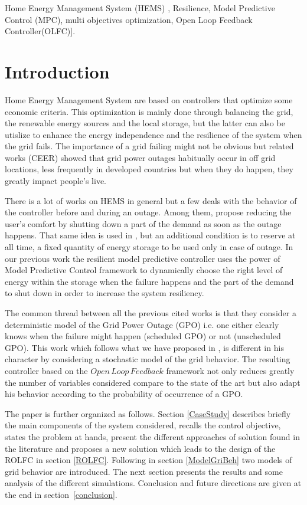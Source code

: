 \documentclass[conference]{IEEEtran}
\begin{document}
\begin{IEEEkeywords}
Home Energy Management System (HEMS) , Resilience, Model Predictive Control (MPC), multi objectives optimization, Open Loop Feedback Controller(OLFC)].
\end{IEEEkeywords}

\section{Introduction}
Home Energy Management System are based on controllers that optimize some economic criteria. This optimization is mainly done through balancing the grid, the renewable energy sources and the local storage, but the latter can also be utislize to enhance the energy independence and the resilience of the system when the grid fails. The importance of a grid failing might not be obvious but related works (CEER) showed that grid power outages habitually occur in off grid locations, less frequently in developed countries but when they do happen, they greatly impact people's live.

There is a lot of works on HEMS in general but a few deals with the behavior of the controller before and during an outage. Among them, \cite{HGhRBo2015,RRoFBe2014} propose reducing the user's comfort by shutting down a part of the demand as soon as the outage happens. That same idea is used in \cite{JMaHJa2016}, but an additional condition is to reserve at all time, a fixed quantity of energy storage to be used only in case of outage. In our previous work \cite{JPrPHa2019} the resilient model predictive controller uses the power of Model Predictive Control framework to dynamically choose the right level of energy within the storage when the failure happens and the part of the demand to shut down in order to increase the system resiliency.

The common thread between all the previous cited works is that they consider a deterministic model of the Grid Power Outage (GPO) i.e. one either clearly knows when the failure might happen (scheduled GPO) or not (unscheduled GPO). 
This work which follows what we have proposed in \cite{JPrPHa2019}, is different in his character by considering a stochastic model of the grid behavior. The resulting controller based on the $ Open\, Loop\, Feedback$ framework  not only reduces greatly the number of variables considered compare to the state of the art but also adapt his behavior according to the probability of occurrence of a GPO.

The paper is further organized as follows. Section \ref{CaseStudy} describes briefly the main components of the system considered, recalls the control objective, states the problem at hands, present the different approaches of solution found in the literature and proposes a new solution which leads to  the design of the ROLFC in section \ref{ROLFC}. Following in section \ref{ModelGriBeh} two models of grid behavior are introduced.  The next section presents the results and some analysis of the different simulations. Conclusion and future directions are given at the end in section~\ref{conclusion}.
\end{document}
